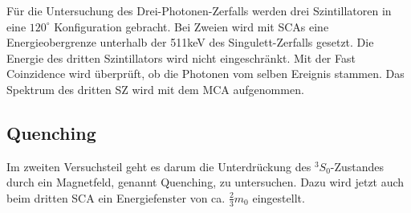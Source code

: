Für die Untersuchung des Drei-Photonen-Zerfalls werden drei Szintillatoren in eine $120^\circ$ Konfiguration gebracht. Bei Zweien wird mit SCAs eine Energieobergrenze unterhalb der 511keV des Singulett-Zerfalls gesetzt. Die Energie des dritten Szintillators wird nicht eingeschränkt. Mit der Fast Coinzidence wird überprüft, ob die Photonen vom selben Ereignis stammen. Das Spektrum des dritten SZ wird mit dem MCA aufgenommen. 

\subsection{Quenching}

Im zweiten Versuchsteil geht es darum die Unterdrückung des ${}^3S_0$-Zustandes durch ein Magnetfeld, genannt Quenching, zu untersuchen. Dazu wird jetzt auch beim dritten SCA ein Energiefenster von ca. $\frac{2}{3} m_0$ eingestellt. 